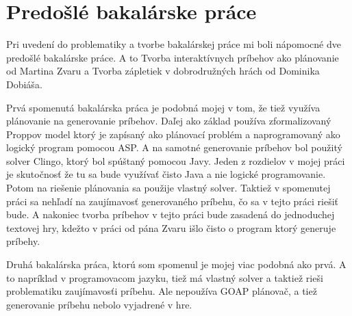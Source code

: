 \section{Predošlé bakalárske práce}
Pri uvedení do problematiky a tvorbe bakalárskej práce mi boli nápomocné dve predošlé bakalárske práce. A to Tvorba interaktívnych príbehov ako plánovanie od Martina Zvaru a Tvorba zápletiek v dobrodružných hrách od Dominika Dobiáša.\par
Prvá spomenutá bakalárska práca je podobná mojej v tom, že tiež využíva plánovanie na generovanie príbehov. Daľej ako základ používa zformalizovaný Proppov model ktorý je zapísaný ako plánovací problém a naprogramovaný ako logický program pomocou ASP. A na samotné generovanie príbehov bol použitý solver Clingo, ktorý bol spúštaný pomocou Javy. Jeden z rozdielov v mojej práci je skutočnosť že tu sa bude využívať čisto Java a nie logické programovanie. Potom na riešenie plánovania sa použije vlastný solver. Taktiež v spomenutej práci sa nehľadí na zaujímavosť generovaného príbehu, čo sa v tejto práci riešiť bude. A nakoniec tvorba príbehov v tejto práci bude zasadená do jednoduchej textovej hry, kdežto v práci od pána Zvaru išlo čisto o program ktorý generuje príbehy.\par
Druhá bakalárska práca, ktorú som spomenul je mojej viac podobná ako prvá. A to napríklad v programovacom jazyku, tiež má vlastný solver a taktiež rieši problematiku zaujímavosťi príbehu. Ale nepoužíva GOAP plánovač, a tiež generovanie príbehu nebolo vyjadrené v hre.